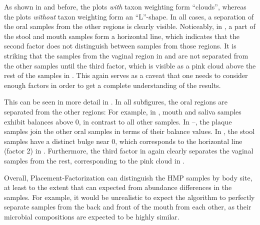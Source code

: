 As shown in  and  before,
the plots \emph{with} taxon weighting form ``clouds'',
whereas the plots \emph{without} taxon weighting form an ``L''-shape.
In all cases, a separation of the oral samples from the other regions is clearly visible.
Noticeably, in ,
a part of the stool and mouth samples form a horizontal line,
which indicates that the second factor does not distinguish between samples from those regions.
It is striking that the samples from the vaginal region in
 and
 are not separated from the other samples
until the third factor, which is visible as a pink cloud above the rest of the samples
in .
This again serves as a caveat that one needs to consider enough factors
in order to get a complete understanding of the results.

This can be seen in more detail in .
In all subfigures, the oral regions are separated from the other regions:
For example, in ,
mouth and saliva samples exhibit balances above \num{0}, in contrast to all other samples.
In --,
the plaque samples join the other oral samples in terms of their balance values.
In , the stool samples have a distinct bulge near \num{0},
which corresponds to the horizontal line (factor 2)
in .
Furthermore, the third factor in 
again clearly separates the vaginal samples from the rest,
corresponding to the pink cloud in .

Overall, Placement-Factorization can distinguish the \ac{HMP} samples by body site,
at least to the extent that can expected from abundance differences in the samples.
For example, it would be unrealistic to expect the algorithm to perfectly separate samples
from the back and front of the mouth from each other,
as their microbial compositions are expected to be highly similar.


